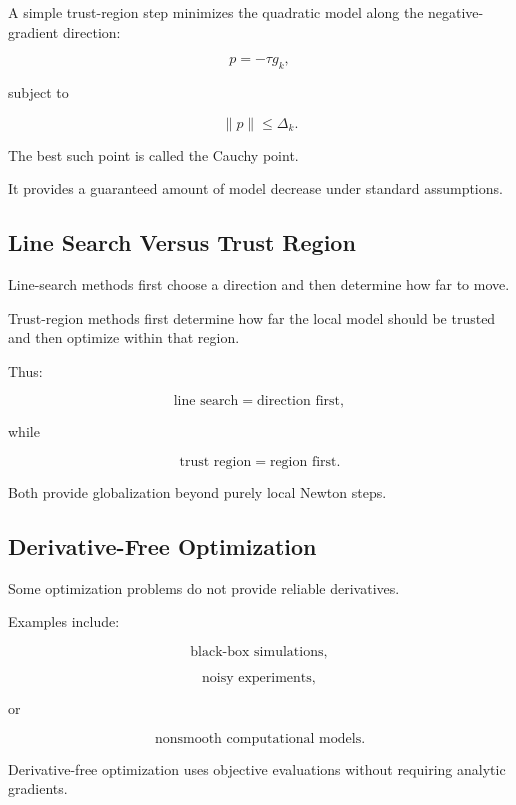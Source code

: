 A simple trust-region step minimizes the quadratic model along the
negative-gradient direction:

\[
p=-\tau g_k,
\]

subject to

\[
\|p\|\leq\Delta_k.
\]

The best such point is called the Cauchy point.

It provides a guaranteed amount of model decrease under standard
assumptions.

\subsection{Line Search Versus Trust Region}
\label{subsec:line-search-vs-trust-region}

Line-search methods first choose a direction and then determine how far to
move.

Trust-region methods first determine how far the local model should be
trusted and then optimize within that region.

Thus:

\[
\boxed{
\text{line search}
=
\text{direction first},
}
\]

while

\[
\boxed{
\text{trust region}
=
\text{region first}.
}
\]

Both provide globalization beyond purely local Newton steps.

\subsection{Derivative-Free Optimization}
\label{subsec:derivative-free-optimization}

Some optimization problems do not provide reliable derivatives.

Examples include:

\[
\boxed{
\text{black-box simulations},
}
\]

\[
\boxed{
\text{noisy experiments},
}
\]

or

\[
\boxed{
\text{nonsmooth computational models}.
}
\]

Derivative-free optimization uses objective evaluations without requiring
analytic gradients.


